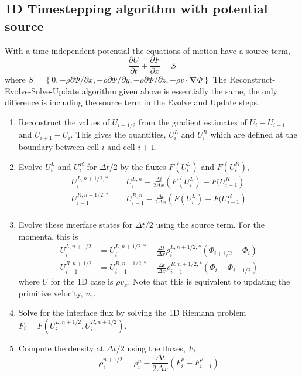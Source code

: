 \documentclass{article}
\newcommand{\ppderiv}[2]{\frac{\partial #1}{\partial #2}}
\newcommand{\del}{\mathbf{\nabla}}
\begin{document}
\subsection{1D Timestepping algorithm with potential source} 
With a time independent potential the equations of motion have a source term, 
\begin{equation}
	\ppderiv{U}{t} +\ppderiv{F}{x} = S
\end{equation}
where $S = \left\{0,-\rho \partial \Phi/ \partial x, -\rho \partial \Phi / \partial y , -\rho \partial \Phi/\partial z, -\rho v \cdot \del \Phi \right\}$
The Reconstruct-Evolve-Solve-Update algorithm given above is essentially the same, the only difference is including the source term in the Evolve and Update steps.
\begin{enumerate}
	\item Reconstruct the values of $U_{i+1/2}$ from the gradient estimates of $U_{i}-U_{i-1}$ and $U_{i+1}-U_{i}$. This gives the quantities, $U_i^L$ and $U_i^R$ which are defined at the boundary between cell $i$ and cell $i+1$. 
	\item Evolve $U_i^L$ and $U_i^R$ for $\Delta t/2$ by the fluxes $F(U_i^L)$ and $F(U_i^R)$,
	\begin{align}
		U_i^{L,n+1/2,*} &= U_i^{L,n} - \frac{\Delta t}{2 \Delta x} \left( F(U_i^L) -F(U_{i-1}^R \right)  \\
		U_{i-1}^{R,n+1/2,*} &= U_{i-1}^{R,n} - \frac{\Delta t}{2 \Delta x} \left( F(U_i^L) -F(U_{i-1}^R \right) \\
	\end{align}
	\item Evolve these interface states for $\Delta t /2$ using the source term. For the momenta, this is
	\begin{align}
		U_i^{L,n+1/2} &= U_i^{L,n+1/2,*} - \frac{\Delta t}{\Delta x} \rho_i^{L,n+1/2,*} \left(\Phi_{i+1/2}-\Phi_i\right) \\
		U_{i-1}^{R,n+1/2} &= U_{i-1}^{R,n+1/2,*}  - \frac{\Delta t}{\Delta x} \rho_{i-1}^{R,n+1/2,*}\left(\Phi_{i}-\Phi_{i-1/2}\right)
	\end{align}
	where $U$ for the 1D case is $\rho v_x$.
	Note that this is equivalent to updating the primitive velocity, $v_x$. 
	\item Solve for the interface flux by solving the 1D Riemann problem $F_i = F(U_i^{L,n+1/2},U_i^{R,n+1/2})$. 
	\item Compute the density at $\Delta t/2$ using the fluxes, $F_i$. 
	\begin{equation}
		\rho_i^{n+1/2} = \rho_i^n - \frac{\Delta t}{2 \Delta x} \left(F_i^\rho - F_{i-1}^\rho \right) 

\end{equation}
\end{enumerate}
\end{document}
